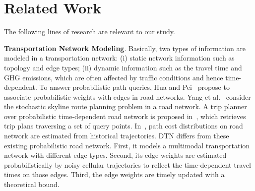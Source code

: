 \documentclass{vldb}
\begin{document}
	
	
	
	\vspace{-10pt}
	\section{Related Work}
	\label{sec:related}
	
	The following lines of research are relevant to our study.
	
	\noindent\textbf{Transportation Network Modeling}. 
	Basically, two types of information are modeled in a transportation network: (i) static network information such as topology and edge types; (ii) dynamic information such as the travel time and GHG emissions, which are often affected by traffic conditions and hence time-dependent. To answer probabilistic path queries, Hua and Pei~\cite{hua2010probabilistic} propose to associate probabilistic weights with edges in road networks. Yang et al.~\cite{yang2014stochastic} consider the stochastic skyline route planning problem in a road network. A trip planner over probabilistic time-dependent road network is proposed in~\cite{lian2014trip}, which retrieves trip plans traversing a set of query points. In~\cite{dai2016path}, path cost distributions on road network are estimated from historical trajectories. DTN differs from these existing probabilistic road network. First, it models a multimodal transportation network with different edge types. Second, its edge weights are estimated probabilistically by noisy cellular trajectories to reflect the time-dependent travel times on those edges. Third, the edge weights are timely updated with a theoretical bound.
	
\end{document}
